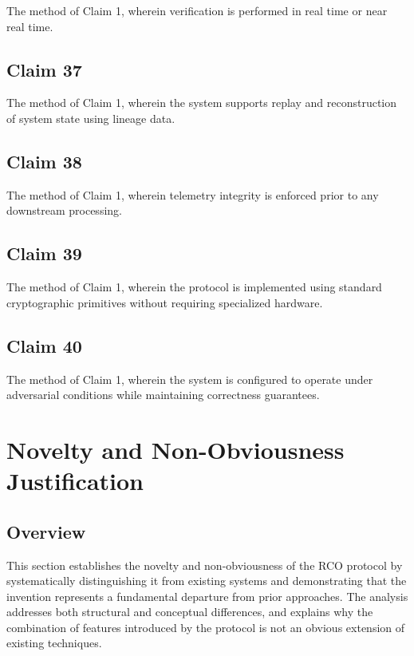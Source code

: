 The method of Claim 1, wherein verification is performed in real time or near real time.

\subsection{Claim 37}

The method of Claim 1, wherein the system supports replay and reconstruction of system state using lineage data.

\subsection{Claim 38}

The method of Claim 1, wherein telemetry integrity is enforced prior to any downstream processing.

\subsection{Claim 39}

The method of Claim 1, wherein the protocol is implemented using standard cryptographic primitives without requiring specialized hardware.

\subsection{Claim 40}

The method of Claim 1, wherein the system is configured to operate under adversarial conditions while maintaining correctness guarantees.

\section{Novelty and Non-Obviousness Justification}

\subsection{Overview}

This section establishes the novelty and non-obviousness of the RCO protocol by systematically distinguishing it from existing systems and demonstrating that the invention represents a fundamental departure from prior approaches. The analysis addresses both structural and conceptual differences, and explains why the combination of features introduced by the protocol is not an obvious extension of existing techniques.

